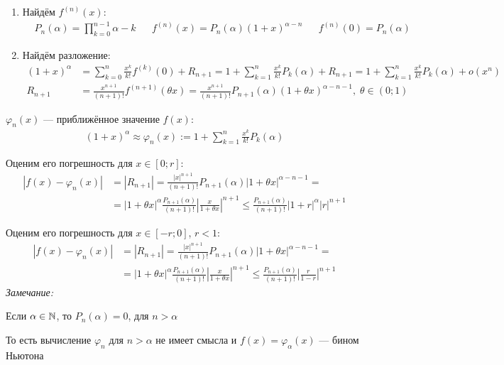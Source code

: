 \documentclass{article}
\begin{document}
\begin{enumerate}
	\item{}Найдём $f^{(n)}(x)$:
	\begin{align*}
		 & P_{n}(\alpha)=\prod_{k=0}^{n-1}\alpha-k &  & f^{(n)}(x)=P_{n}(\alpha)(1+x)^{\alpha-n} &  & f^{(n)}(0)=P_{n}(\alpha)
	\end{align*}
	\item{}Найдём разложение:
	\begin{align*}
		(1+x)^{\alpha} & =\sum_{k=0}^{n}\frac{x^{k}}{k!}f^{(k)}(0)+R_{n+1}=1+\sum_{k=1}^{n}\frac{x^{k}}{k!}P_{k}(\alpha)+R_{n+1}
		=1+\sum_{k=1}^{n}\frac{x^{k}}{k!}P_{k}(\alpha)+o(x^{n})                                                                                     \\
		R_{n+1}        & =\frac{x^{n+1}}{(n+1)!}f^{(n+1)}(\theta x)=\frac{x^{n+1}}{(n+1)!}P_{n+1}(\alpha)(1+\theta x)^{\alpha-n-1},\;\theta\in(0;1)
	\end{align*}
\end{enumerate}

$\varphi_{n}(x)$ --- приближённое значение $f(x)$:
\begin{align*}
	(1+x)^{\alpha}\approx\varphi_{n}(x):=1+\sum_{k=1}^{n}\frac{x^{k}}{k!}P_{k}(\alpha)
\end{align*}

Оценим его погрешность для $x\in[0;r]$:
\begin{align*}
	|f(x)-\varphi_{n}(x)| & =|R_{n+1}|=\frac{|x|^{n+1}}{(n+1)!}P_{n+1}(\alpha)|1+\theta x|^{\alpha-n-1}=                \\
	                      & =|1+\theta x|^{\alpha}\frac{P_{n+1}(\alpha)}{(n+1)!}\left|\frac{x}{1+\theta x}\right|^{n+1}
	\leq\frac{P_{n+1}(\alpha)}{(n+1)!}|1+r|^{\alpha}|r|^{n+1}
\end{align*}

Оценим его погрешность для $x\in[-r;0]$, $r<1$:
\begin{align*}
	|f(x)-\varphi_{n}(x)| & =|R_{n+1}|=\frac{|x|^{n+1}}{(n+1)!}P_{n+1}(\alpha)|1+\theta x|^{\alpha-n-1}=                \\
	                      & =|1+\theta x|^{\alpha}\frac{P_{n+1}(\alpha)}{(n+1)!}\left|\frac{x}{1+\theta x}\right|^{n+1}
	\leq\frac{P_{n+1}(\alpha)}{(n+1)!}\left|\frac{r}{1-r}\right|^{n+1}
\end{align*}
{\it Замечание:}

Если $\alpha\in\mathbb{N}$, то $P_{n}(\alpha)=0$, для $n>\alpha$

То есть вычисление $\varphi_{n}$ для $n>\alpha$ не имеет смысла и $f(x)=\varphi_{\alpha}(x)$ --- бином Ньютона

\pagebreak

\end{document}
